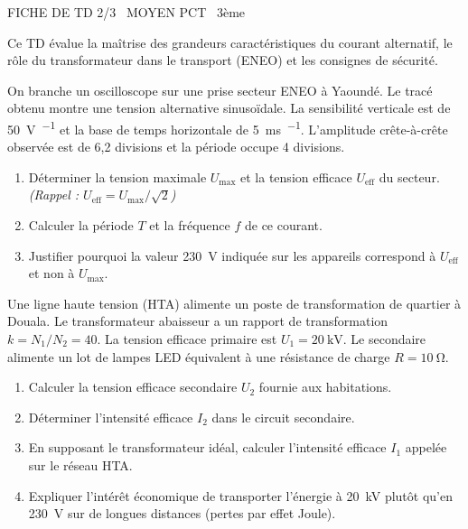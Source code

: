 \documentclass[11pt]{article}
\begin{document}
\begin{tcolorbox}[enhanced,colback=popink,colframe=popink,arc=10pt,boxrule=0pt,left=12pt,right=12pt,top=9pt,bottom=9pt]
{\color{white}\popxbold\small FICHE DE TD 2/3 \textbullet\ MOYEN \hfill PCT \textbullet\ 3ème\par}
\end{tcolorbox}
\vspace{4pt}
Ce TD évalue la maîtrise des grandeurs caractéristiques du courant alternatif, le rôle du transformateur dans le transport (ENEO) et les consignes de sécurité.

\begin{exercice}
On branche un oscilloscope sur une prise secteur ENEO à Yaoundé. Le tracé obtenu montre une tension alternative sinusoïdale. La sensibilité verticale est de \SI{50}{\volt\per\division} et la base de temps horizontale de \SI{5}{\milli\second\per\division}. L'amplitude crête-à-crête observée est de 6,2 divisions et la période occupe 4 divisions.
\begin{enumerate}
    \item Déterminer la tension maximale $U_{\text{max}}$ et la tension efficace $U_{\text{eff}}$ du secteur. \textit{(Rappel : $U_{\text{eff}} = U_{\text{max}}/\sqrt{2}$)} 
    \item Calculer la période $T$ et la fréquence $f$ de ce courant. 
    \item Justifier pourquoi la valeur \SI{230}{\volt} indiquée sur les appareils correspond à $U_{\text{eff}}$ et non à $U_{\text{max}}$.
\end{enumerate}
\end{exercice}

\begin{exercice}
Une ligne haute tension (HTA) alimente un poste de transformation de quartier à Douala. Le transformateur abaisseur a un rapport de transformation $k = N_1/N_2 = 40$. La tension efficace primaire est $U_1 = \SI{20}{\kilo\volt}$. Le secondaire alimente un lot de lampes LED équivalent à une résistance de charge $R = \SI{10}{\ohm}$.
\begin{enumerate}
    \item Calculer la tension efficace secondaire $U_2$ fournie aux habitations. 
    \item Déterminer l'intensité efficace $I_2$ dans le circuit secondaire. 
    \item En supposant le transformateur idéal, calculer l'intensité efficace $I_1$ appelée sur le réseau HTA. 
    \item Expliquer l'intérêt économique de transporter l'énergie à \SI{20}{\kilo\volt} plutôt qu'en \SI{230}{\volt} sur de longues distances (pertes par effet Joule).
\end{enumerate}
\end{exercice}
\end{document}
